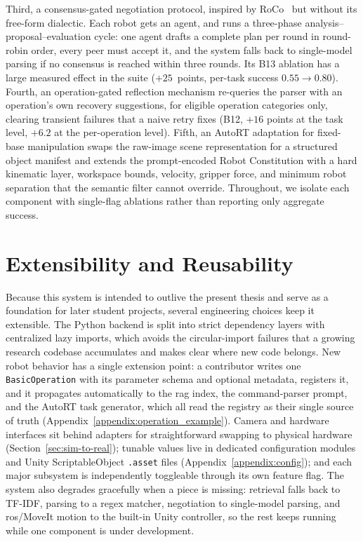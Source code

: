 \documentclass[
     12pt,
     a4paper,
     BCOR=10mm,
     DIV=14,
     listof=totoc,
     bibliography=totoc,
     parskip,
     twoside,
     headsepline
     ]{scrreprt}
\begin{document}
Third, a consensus-gated negotiation protocol, inspired by RoCo~\cite{mandi2023rocodialecticmultirobotcollaboration} but without its free-form dialectic. Each robot gets an agent, and runs a three-phase analysis--proposal--evaluation cycle: one agent drafts a complete plan per round in round-robin order, every peer must accept it, and the system falls back to single-model parsing if no consensus is reached within three rounds. Its B13 ablation has a large measured effect in the suite ($+25$~points, per-task success $0.55\rightarrow0.80$). Fourth, an operation-gated reflection mechanism re-queries the parser with an operation's own recovery suggestions, for eligible operation categories only, clearing transient failures that a naive retry fixes (B12, $+16$ points at the task level, $+6.2$ at the per-operation level). Fifth, an AutoRT adaptation for fixed-base manipulation swaps the raw-image scene representation for a structured object manifest and extends the prompt-encoded Robot Constitution with a hard kinematic layer, workspace bounds, velocity, gripper force, and minimum robot separation that the semantic filter cannot override. Throughout, we isolate each component with single-flag ablations rather than reporting only aggregate success.

\section{Extensibility and Reusability}\label{sec:extensibility}
Because this system is intended to outlive the present thesis and serve as a foundation for later student projects, several engineering choices keep it extensible. The Python backend is split into strict dependency layers with centralized lazy imports, which avoids the circular-import failures that a growing research codebase accumulates and makes clear where new code belongs. New robot behavior has a single extension point: a contributor writes one \texttt{BasicOperation} with its parameter schema and optional metadata, registers it, and it propagates automatically to the \gls{rag} index, the command-parser prompt, and the AutoRT task generator, which all read the registry as their single source of truth (Appendix~\ref{appendix:operation_example}). Camera and hardware interfaces sit behind adapters for straightforward swapping to physical hardware (Section~\ref{sec:sim-to-real}); tunable values live in dedicated configuration modules and Unity ScriptableObject \texttt{.asset} files (Appendix~\ref{appendix:config}); and each major subsystem is independently toggleable through its own feature flag. The system also degrades gracefully when a piece is missing: retrieval falls back to TF-IDF, parsing to a regex matcher, negotiation to single-model parsing, and \gls{ros}/MoveIt motion to the built-in Unity controller, so the rest keeps running while one component is under development.
\end{document}
